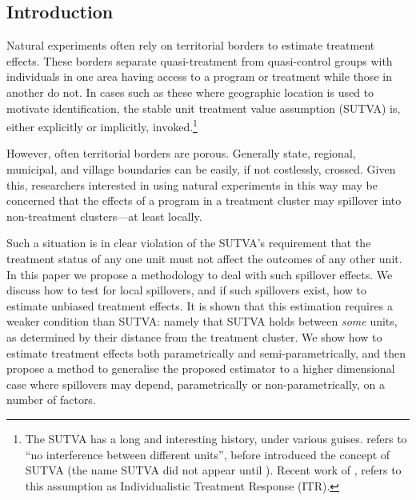 \documentclass{article}
\begin{document}
\newpage
\begin{spacing}{1.1}
\section{Introduction}
Natural experiments often rely on territorial borders to estimate treatment 
effects.  These borders separate quasi-treatment from quasi-control groups with
individuals in one area having access to a program or treatment while those in 
another do not.  In cases such as these where geographic location is used to 
motivate identification, the stable unit treatment value assumption (SUTVA) is, 
either explicitly or implicitly, invoked.\footnote{The SUTVA has a long and 
interesting history, under various guises. \citet{Cox1958} refers to ``no 
interference between different units'', before \citet{Rubin1978} introduced the 
concept of SUTVA (the name SUTVA did not appear until \citet{Rubin1980}).  
Recent work of \citet{Manski2013}, refers to this assumption as Individualistic 
Treatment Response (ITR).}

However, often territorial borders are porous.  Generally state, regional,
municipal, and village boundaries can be easily, if not costlessly, crossed.
Given this, researchers interested in using natural experiments in this way may
be concerned that the effects of a program in a treatment cluster may spillover 
into non-treatment clusters---at least locally.

Such a situation is in clear violation of the SUTVA's requirement that the treatment
status of any one unit must not affect the outcomes of any other unit.  In this 
paper we propose a methodology to deal with such spillover effects.  We
discuss how to test for local spillovers, and if such spillovers exist, how to 
estimate unbiased treatment effects.  It is shown that this estimation requires
a weaker condition than SUTVA: namely that SUTVA holds between \emph{some} units, 
as determined by their distance from the treatment cluster.  We show how to 
estimate treatment effects both parametrically and semi-parametrically, and then
propose a method to generalise the proposed estimator to a higher dimensional 
case where spillovers may depend, parametrically or non-parametrically, on a number 
of factors.


\end{spacing}
\end{document}
